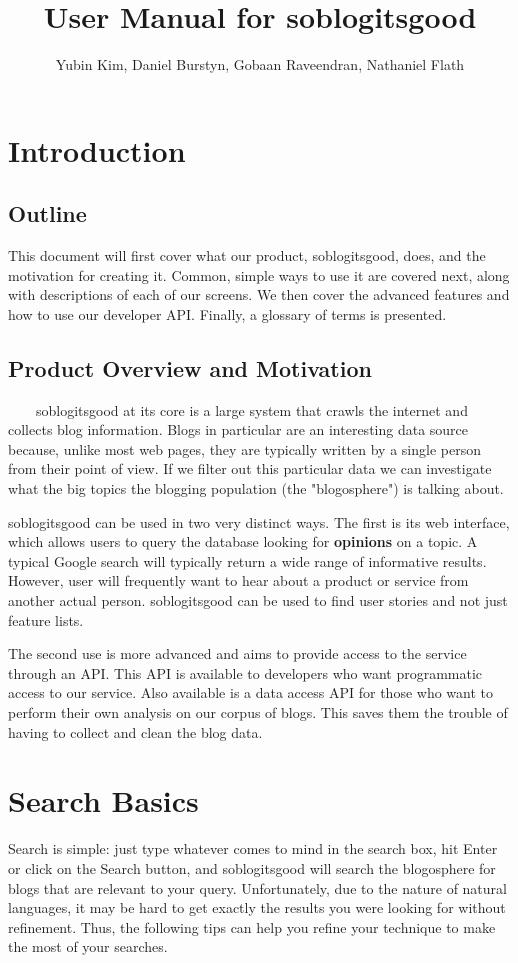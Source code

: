 \documentclass[titlepage]{article}
\title{User Manual for \textsf{soblogitsgood}}
\author{Yubin Kim, Daniel Burstyn, Gobaan Raveendran, Nathaniel Flath}
\begin{document}
\maketitle
\newpage
\tableofcontents
\newpage

\section{Introduction}

\subsection{Outline}
This document will first cover what our product, \textsf{soblogitsgood},
does, and the motivation for creating it.  Common, simple ways to use
it are covered next, along with descriptions of each of our screens.
We then cover the advanced features and how to use our developer API.
Finally, a glossary of terms is presented.

\subsection{Product Overview and Motivation}
\ \ \ \ \textsf{soblogitsgood} at its core is a large system that crawls the internet and
collects blog information.  Blogs in particular are an interesting data source
because, unlike most web pages, they are typically written by a single person
from their point of view.  If we filter out this particular data we can
investigate what the big topics the blogging population (the "blogosphere") is
talking about.

\textsf{soblogitsgood} can be used in two very distinct ways.  The first is
its web interface, which allows users to query the database looking for 
\textbf{opinions} on a topic.  A typical Google search will typically return a
wide range of informative results.  However, user will frequently want to hear
about a product or service from another actual person.  \textsf{soblogitsgood}
can be used to find user stories and not just feature lists.

The second use is more advanced and aims to provide access to the service
through an API. This API is available to developers who want programmatic
access to our service. Also available is a data access API for those who want
to perform their own analysis on our corpus of blogs.  
This saves them the trouble of having to collect and clean the blog data.


\section{Search Basics}
Search is simple: just type whatever comes to mind in the search box, hit
Enter or click on the Search button, and \textsf{soblogitsgood} will search the
blogosphere for blogs that are relevant to your query.  Unfortunately, due to
the nature of natural languages, it may be hard to get exactly the results you
were looking for without refinement. Thus, the following tips can help you
refine your technique to make the most of your searches.
\end{document}
